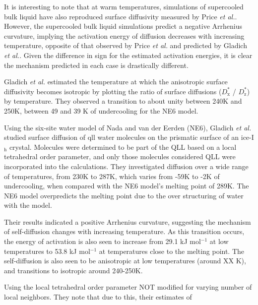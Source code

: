 It is interesting to note that at warm temperatures, simulations of
supercooled bulk liquid\cite{Picaud2006,Mahoney2001} have also reproduced surface
diffusivity measured by Price \textit{et al.}. However, the
supercooled bulk liquid simulations predict a negative Arrhenius
curvature, implying the activation energy of diffusion decreases with
increasing temperature, opposite of that observed by Price \textit{et
  al.} and predicted by Gladich \textit{et al.}. Given the difference
in sign for the estimated activation energies, it is clear the
mechanism predicted in each case is drastically different. 

Gladich \textit{et al.} estimated the temperature at which the
anisotropic surface diffusivity becomes isotropic by plotting the
ratio of surface diffusions ($D^{*}_\mathrm{x}$ / $D^{*}_\mathrm{z}$)
by temperature. They observed a transition to about unity between 240K
and 250K, between 49 and 39 K of undercooling for the NE6 model.




Using the six-site water model of Nada and van der Eerden (NE6),
Gladich \textit{et al.} studied surface diffusion of qll water
molecules on the prismatic surface of an ice-I$_\mathrm{h}$
crystal.\cite{Gladich2011} Molecules were determined to be part of the
QLL based on a local tetrahedral order parameter, and only those
molecules considered QLL were incorporated into the calculations. They
investigated diffusion over a wide range of temperatures, from 230K to
287K, which varies from -59K to -2K of undercooling, when compared
with the NE6 model's melting point of 289K. The NE6 model overpredicts
the melting point due to the over structuring of water with the model.

Their results indicated a positive Arrhenius curvature, suggesting the
mechanism of self-diffusion changes with increasing temperature. As
this transition occurs, the energy of activation is also seen to
increase from 29.1 kJ mol$^{-1}$ at low temperatures to 53.8 kJ
mol$^{-1}$ at temperatures close to the melting point. The
self-diffusion is also seen to be anisotropic at low temperatures
(around XX K), and transitions to isotropic around 240-250K. 

Using the local tetrahedral order parameter NOT modified for varying
number of local neighbors. They note that due to this, their estimates
of 


